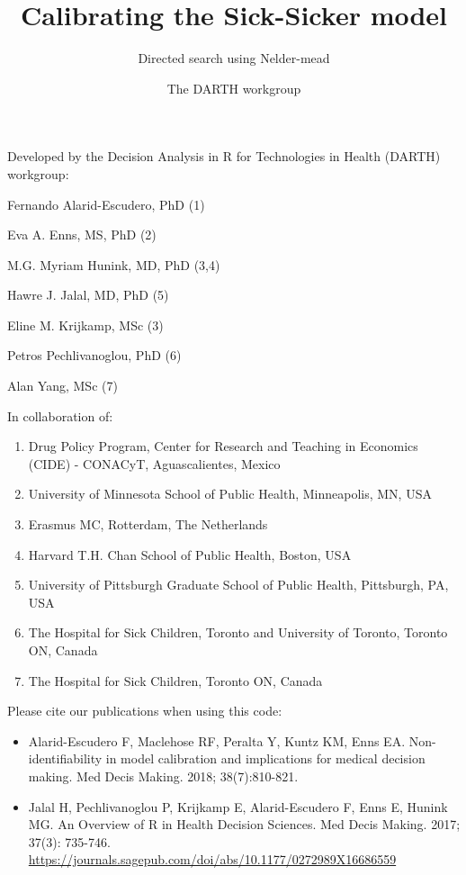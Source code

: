 \documentclass[
]{article}
\title{Calibrating the Sick-Sicker model}
\subtitle{Directed search using Nelder-mead}
\author{The DARTH workgroup}
\date{}
\providecommand{\tightlist}{%
  \setlength{\itemsep}{0pt}\setlength{\parskip}{0pt}}
\begin{document}
\maketitle

Developed by the Decision Analysis in R for Technologies in Health
(DARTH) workgroup:

Fernando Alarid-Escudero, PhD (1)

Eva A. Enns, MS, PhD (2)

M.G. Myriam Hunink, MD, PhD (3,4)

Hawre J. Jalal, MD, PhD (5)

Eline M. Krijkamp, MSc (3)

Petros Pechlivanoglou, PhD (6)

Alan Yang, MSc (7)

In collaboration of:

\begin{enumerate}
\def\labelenumi{\arabic{enumi}.}
\tightlist
\item
  Drug Policy Program, Center for Research and Teaching in Economics
  (CIDE) - CONACyT, Aguascalientes, Mexico
\item
  University of Minnesota School of Public Health, Minneapolis, MN, USA
\item
  Erasmus MC, Rotterdam, The Netherlands
\item
  Harvard T.H. Chan School of Public Health, Boston, USA
\item
  University of Pittsburgh Graduate School of Public Health, Pittsburgh,
  PA, USA
\item
  The Hospital for Sick Children, Toronto and University of Toronto,
  Toronto ON, Canada
\item
  The Hospital for Sick Children, Toronto ON, Canada
\end{enumerate}

Please cite our publications when using this code:

\begin{itemize}
\item
  Alarid-Escudero F, Maclehose RF, Peralta Y, Kuntz KM, Enns EA.
  Non-identifiability in model calibration and implications for medical
  decision making. Med Decis Making. 2018; 38(7):810-821.
\item
  Jalal H, Pechlivanoglou P, Krijkamp E, Alarid-Escudero F, Enns E,
  Hunink MG. An Overview of R in Health Decision Sciences. Med Decis
  Making. 2017; 37(3): 735-746.
  \url{https://journals.sagepub.com/doi/abs/10.1177/0272989X16686559}
\end{itemize}
\end{document}
